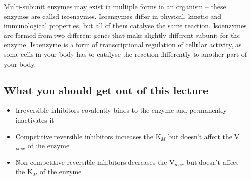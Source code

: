 Multi-subunit enzymes may exist in multiple forms in an organism -- these enzymes are called isoenzymes.
Isoenzymes differ in physical, kinetic and immunological properties, but all of them catalyse the same reaction.
Isoenzymes are formed from two different genes that make slightly different subunit for the enzyme.
Isoenzyme is a form of transcriptional regulation of cellular activity, as some cells in your body has to catalyse the reaction differently to another part of your body.

\subsection*{What you should get out of this lecture}

\begin{itemize}
	\item Irreversible inhibitors covalently binds to the enzyme and permanently inactivates it
	\item Competitive reversible inhibitors increases the K$_M$ but doesn't affect the V$_{max}$ of the enzyme
	\item Non-competitive reversible inhibitors decreases the V$_{max}$ but doesn't affect the K$_M$ of the enzyme
\end{itemize}
